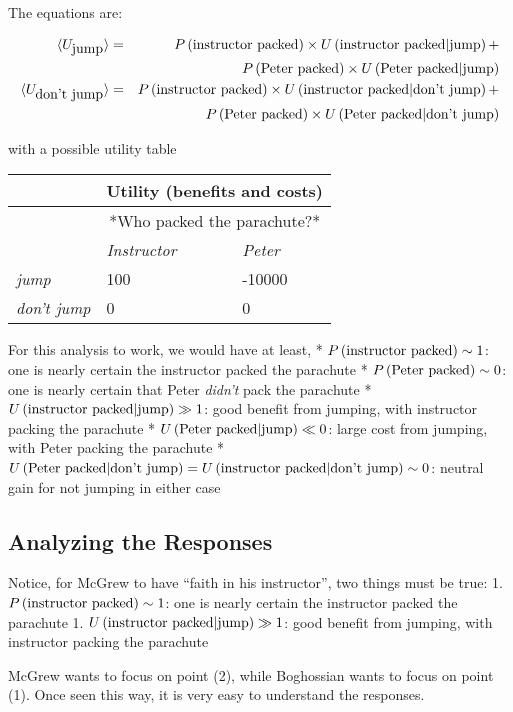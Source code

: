 \documentclass{tufte-book}
\begin{document}
The equations are:

\begin{eqnarray*}
\langle U_{\mbox{jump}}\rangle &=& \P{instructor packed}\times \Ug{instructor packed}{jump} + \\
&& \P{Peter packed}\times \Ug{Peter packed}{jump} \\
\langle U_{\mbox{don't jump}}\rangle &=& \P{instructor packed}\times \Ug{instructor packed}{don't jump} + \\
&& \P{Peter packed}\times \Ug{Peter packed}{don't jump}
\end{eqnarray*}

with a possible utility table

\begin{tabular}{@{}lll@{}}
\toprule
 & \multicolumn{2}{c}{\textbf{Utility (benefits and costs)}}  \\ \midrule
 & \multicolumn{2}{c}{*Who packed the parachute?*}  \\ 
  & \textit{Instructor } & \textit{Peter}\\
\textit{jump} & 100 & -10000   \\
\textit{don't jump} & 0 & 0  \\ \bottomrule
\end{tabular}\vspace{.1in}

For this analysis to work, we would have at least, *
\(\P{instructor packed} \sim 1\): one is nearly certain the instructor
packed the parachute * \(\P{Peter packed} \sim 0\): one is nearly
certain that Peter \emph{didn't} pack the parachute *
\(\Ug{instructor packed}{jump}\gg 1\): good benefit from jumping, with
instructor packing the parachute * \(\Ug{Peter packed}{jump}\ll 0\):
large cost from jumping, with Peter packing the parachute *
\(\Ug{Peter packed}{don't jump}=\Ug{instructor packed}{don't jump}\sim 0\):
neutral gain for not jumping in either case

\subsection{Analyzing the Responses}\label{sec:mcgrewresponse}

Notice, for McGrew to have ``faith in his instructor'', two things must
be true: 1. \(\P{instructor packed} \sim 1\): one is nearly certain the
instructor packed the parachute 1.
\(\Ug{instructor packed}{jump}\gg 1\): good benefit from jumping, with
instructor packing the parachute

McGrew wants to focus on point (2), while Boghossian wants to focus on
point (1). Once seen this way, it is very easy to understand the
responses.
\end{document}
